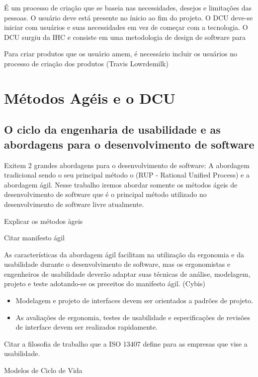 É um processo de criação que se baseia nas necessidades, desejos e limitações das pessoas. O usuário deve está presente no ínicio ao fim do projeto.
O DCU deve-se iniciar com usuários e suas necessidades em vez de começar com a tecnologia.
O DCU surgiu da IHC e consiste em uma metodologia de design de software para 


Para criar produtos que os usuário amem, é necessário incluir os usuários no processo de criação dos produtos (Travis Lowrdemilk)

\section{Métodos Agéis e o DCU}

\subsection{O ciclo da engenharia de usabilidade e as abordagens para o desenvolvimento de software}

	Exitem 2 grandes abordagens para o desenvolvimento de software: A abordagem tradicional sendo o seu principal método o (RUP - Rational Unified Process) e a abordagem ágil.
	Nesse trabalho iremos abordar somente os métodos ágeis de desenvolvimento de software que é o principal método utilizado no desenvolvimento de software livre atualmente.

Explicar os métodos àgeis

Citar manifesto ágil

As características da abordagem ágil facilitam na utilização da ergonomia e da usabilidade durante o desenvolvimento de software, mas os ergonomistas e engenheiros de usabilidade deverão adaptar suas técnicas de análise, modelagem, projeto e teste adotando-se os preceitos do manifesto ágil. (Cybis)

\begin{itemize}
\item Modelagem e projeto de interfaces devem ser orientados a padrões de projeto.
\item As avaliações de ergonomia, testes de usabilidade e especificações de revisões de interface devem ser realizados rapidamente.
\end{itemize}

Citar a filosofia de trabalho que a  ISO 13407 define para as empresas que vise a usabilidade.

Modelos de Ciclo de Vida

